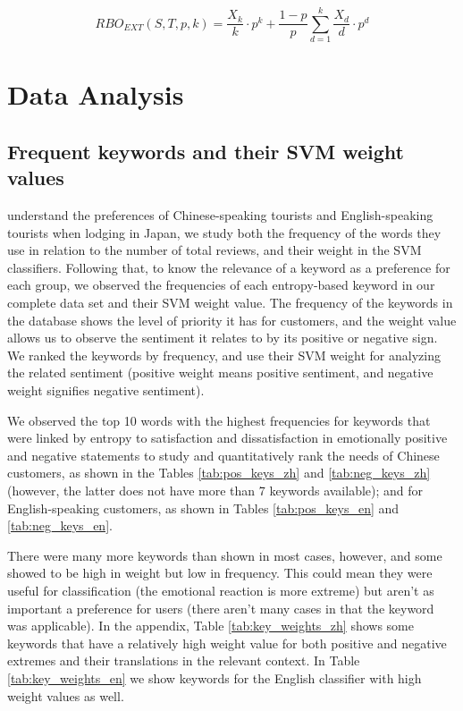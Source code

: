 \begin{equation}\label{eq:rbo_ext}
RBO_{EXT}(S,T,p,k) = \frac{X_k}{k} \cdot p^k + \frac{1-p}{p} \sum_{d=1}^k{\frac{X_d}{d} \cdot p^d}
\end{equation}

\section{Data Analysis}\label{dataanalysis}

\subsection{Frequent keywords and their SVM weight values}\label{svmresults}

\DIFdelbegin {}\DIFdelend \DIFaddbegin {}\DIFaddend understand the preferences of Chinese-speaking tourists and English-speaking tourists when lodging in Japan, we study both the frequency of the words they use in relation to the number of total reviews, and their weight in the SVM classifiers. Following that, to know the relevance of a keyword as a preference for each group, we observed the frequencies of each entropy-based keyword in our complete data set and their SVM weight value. The frequency of the keywords in the database shows the level of priority it has for customers, and the weight value allows us to observe the sentiment it relates to by its positive or negative sign. We ranked the keywords by frequency, and use their SVM weight for analyzing the related sentiment (positive weight means positive sentiment, and negative weight signifies negative sentiment). 

We observed the top 10 words with the highest frequencies for keywords that were linked by entropy to satisfaction and dissatisfaction in emotionally positive and negative statements to study and quantitatively rank the needs of Chinese customers, as shown in the Tables \ref{tab:pos_keys_zh} and \ref{tab:neg_keys_zh} (however, the latter does not have more than 7 keywords available); and for English-speaking customers, as shown in Tables \ref{tab:pos_keys_en} and \ref{tab:neg_keys_en}.

There were many more keywords than shown in most cases, however, and some showed to be high in weight but low in frequency. This could mean they were useful for classification (the emotional reaction is more extreme) but aren't as important a preference for users (there aren't many cases in that the keyword was applicable). In the appendix, Table \ref{tab:key_weights_zh} shows some keywords that have a relatively high weight value for both positive and negative extremes and their translations in the relevant context. In Table \ref{tab:key_weights_en} we show keywords for the English classifier with high weight values as well.

